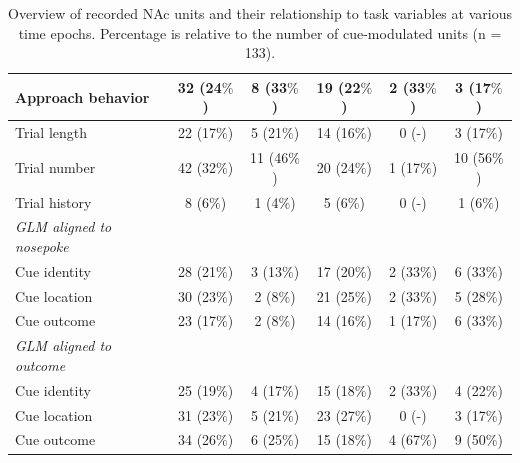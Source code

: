\documentclass[11pt]{article}
\begin{document}
\begin{table}[p]
\begin{tabular}{l c  c c c c}
\hline
\hspace{6mm}Approach behavior      & 32 (24$\%$)         & 8 (33$\%$)          & 19 (22$\%$)          & 2 (33$\%$)          & 3 (17$\%$)\\
\hline
\hspace{6mm}Trial length       & 22 (17$\%$)        & 5 (21$\%$)          & 14 (16$\%$)         & 0 (-)         & 3 (17$\%$)\\
\hline
\hspace{6mm}Trial number       & 42 (32$\%$)         & 11 (46$\%$)          & 20 (24$\%$)         & 1 (17$\%$)          & 10 (56$\%$)\\
\hline
\hspace{6mm}Trial history       & 8 (6$\%$)         & 1 (4$\%$)          & 5 (6$\%$)          & 0 (-)          & 1 (6$\%$)\\
\hline
\hspace{3mm}\textit{GLM aligned to nosepoke}                       &         &       &          &          &\\
\hline
\hspace{6mm}Cue identity       & 28 (21$\%$)         & 3 (13$\%$)          & 17 (20$\%$)          & 2 (33$\%$)          & 6 (33$\%$)\\
\hline
\hspace{6mm}Cue location       & 30 (23$\%$)         & 2 (8$\%$)          & 21 (25$\%$)          & 2 (33$\%$)          & 5 (28$\%$)\\
\hline
\hspace{6mm}Cue outcome       & 23 (17$\%$)        & 2 (8$\%$)          & 14 (16$\%$)        & 1 (17$\%$)          & 6 (33$\%$)\\
\hline
\hspace{3mm}\textit{GLM aligned to outcome}                       &         &       &          &          &\\
\hline
\hspace{6mm}Cue identity       & 25 (19$\%$)        & 4 (17$\%$)          & 15 (18$\%$)       & 2 (33$\%$)          & 4 (22$\%$)\\
\hline
\hspace{6mm}Cue location       & 31 (23$\%$)        & 5 (21$\%$)          & 23 (27$\%$)       & 0 (-)          & 3 (17$\%$)\\
\hline
\hspace{6mm}Cue outcome       & 34 (26$\%$)        & 6 (25$\%$)          & 15 (18$\%$)       & 4 (67$\%$)          & 9 (50$\%$)\\
\hline

\end{tabular}
\caption {Overview of recorded NAc units and their relationship to
  task variables at various time epochs. Percentage is relative to the
  number of cue-modulated units (n = 133).} \label{tbl1} 
\end{table}
\end{document}
